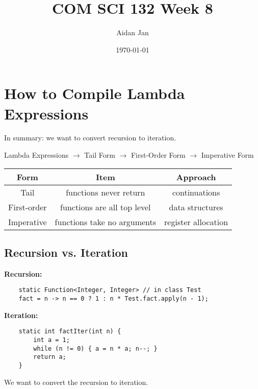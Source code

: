 \documentclass[10pt]{article}
\title{COM SCI 132 Week 8}
\author{Aidan Jan}
\date{\today}
\begin{document}
\maketitle

\section*{How to Compile Lambda Expressions}
In summary: we want to convert recursion to iteration.
\begin{center}
    Lambda Expressions $\rightarrow$ Tail Form $\rightarrow$ First-Order Form $\rightarrow$ Imperative Form\\
    \begin{tabular}{c|c|c}
        \textbf{Form} & \textbf{Item} & \textbf{Approach}\\
        \hline
        Tail & functions never return & continuations\\
        First-order & functions are all top level & data structures\\
        Imperative & functions take no arguments & register allocation
    \end{tabular}
\end{center}

\subsection*{Recursion vs. Iteration}
\textbf{Recursion:}
\begin{verbatim}
    static Function<Integer, Integer> // in class Test
    fact = n -> n == 0 ? 1 : n * Test.fact.apply(n - 1);
\end{verbatim}
\textbf{Iteration:}
\begin{verbatim}
    static int factIter(int n) {
        int a = 1;
        while (n != 0) { a = n * a; n--; }
        return a;
    }
\end{verbatim}
We want to convert the recursion to iteration.
\end{document}
